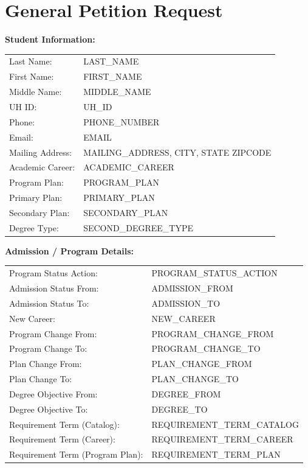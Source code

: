 \documentclass[12pt]{article}
\begin{document}
\section*{General Petition Request}

\textbf{Student Information:}

\begin{tabular}{ll}
Last Name: & LAST_NAME \\
First Name: & FIRST_NAME \\
Middle Name: & MIDDLE_NAME \\
UH ID: & UH_ID \\
Phone: & PHONE_NUMBER \\
Email: & EMAIL \\
Mailing Address: & MAILING_ADDRESS, CITY, STATE ZIPCODE \\
Academic Career: & ACADEMIC_CAREER \\
Program Plan: & PROGRAM_PLAN \\
Primary Plan: & PRIMARY_PLAN \\
Secondary Plan: & SECONDARY_PLAN \\
Degree Type: & SECOND_DEGREE_TYPE \\
\end{tabular}

\vspace{0.5cm}

\textbf{Admission / Program Details:}

\begin{tabular}{ll}
Program Status Action: & PROGRAM_STATUS_ACTION \\
Admission Status From: & ADMISSION_FROM \\
Admission Status To: & ADMISSION_TO \\
New Career: & NEW_CAREER \\
Program Change From: & PROGRAM_CHANGE_FROM \\
Program Change To: & PROGRAM_CHANGE_TO \\
Plan Change From: & PLAN_CHANGE_FROM \\
Plan Change To: & PLAN_CHANGE_TO \\
Degree Objective From: & DEGREE_FROM \\
Degree Objective To: & DEGREE_TO \\
Requirement Term (Catalog): & REQUIREMENT_TERM_CATALOG \\
Requirement Term (Career): & REQUIREMENT_TERM_CAREER \\
Requirement Term (Program Plan): & REQUIREMENT_TERM_PLAN \\
\end{tabular}
\end{document}
